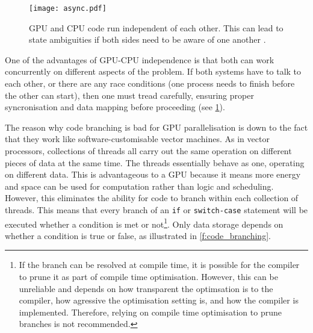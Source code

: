 \begin{figure}
    \centering
    \texttt{[image: async.pdf]}
    \caption[GPU and CPU asynchronous execution.]{GPU and CPU code run independent of each other. This can lead to state ambiguities if both sides need to be aware of one another \cite{nvidia}.}
    \label{f:async_gpu_cpu}
\end{figure}
One of the advantages of GPU-CPU independence is that both can work concurrently on different aspects of the problem. If both systems have to talk to each other, or there are any race conditions (one process needs to finish before the other can start), then one must tread carefully, ensuring proper syncronisation and data mapping before proceeding (see \cref{f:async_gpu_cpu}).

The reason why code branching is bad for GPU parallelisation is down to the fact that they work like software-customisable vector machines. As in vector processors, collections of threads all carry out the same operation on different pieces of data at the same time. The threads essentially behave as one, operating on different data. This is advantageous to a GPU because it means more energy and space can be used for computation rather than logic and scheduling. However, this eliminates the ability for code to branch within each collection of threads. This means that every branch of an \texttt{if} or \texttt{switch-case} statement will be executed whether a condition is met or not\footnote{If the branch can be resolved at compile time, it is possible for the compiler to prune it as part of compile time optimisation. However, this can be unreliable and depends on how transparent the optimsation is to the compiler, how agressive the optimisation setting is, and how the compiler is implemented. Therefore, relying on compile time optimisation to prune branches is not recommended.}. Only data storage depends on whether a condition is true or false, as illustrated in \cref{f:code_branching}.

